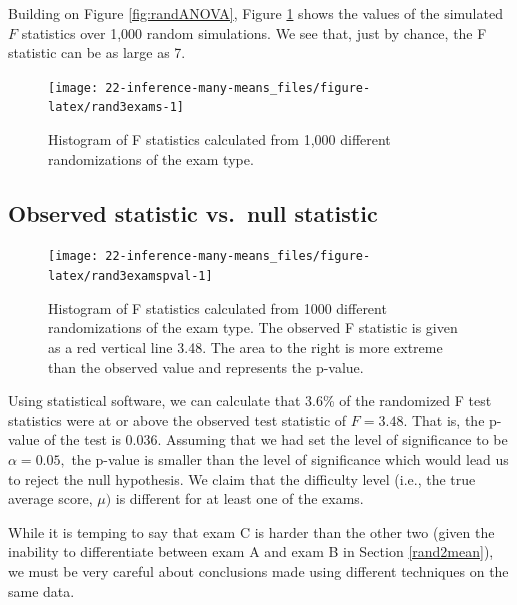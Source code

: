 \documentclass[
  10pt,
  openany]{book}
\begin{document}
Building on Figure \ref{fig:randANOVA}, Figure \ref{fig:rand3exams} shows the values of the simulated \(F\) statistics over 1,000 random simulations.
We see that, just by chance, the F statistic can be as large as 7.

\begin{figure}[h]

{\centering \texttt{[image: 22-inference-many-means\_files/figure-latex/rand3exams-1]} 

}

\caption{Histogram of F statistics calculated from 1,000 different randomizations of the exam type.}\label{fig:rand3exams}
\end{figure}

\hypertarget{observed-statistic-vs.-null-statistic}{%
\subsection{Observed statistic vs.~null statistic}\label{observed-statistic-vs.-null-statistic}}

\begin{figure}[h]

{\centering \texttt{[image: 22-inference-many-means\_files/figure-latex/rand3examspval-1]} 

}

\caption{Histogram of F statistics calculated from 1000 different randomizations of the exam type. The observed F statistic is given as a red vertical line 3.48.  The area to the right is more extreme than the observed value and represents the p-value.}\label{fig:rand3examspval}
\end{figure}

Using statistical software, we can calculate that 3.6\% of the randomized F test statistics were at or above the observed test statistic of \(F= 3.48.\) That is, the p-value of the test is 0.036.
Assuming that we had set the level of significance to be \(\alpha = 0.05,\) the p-value is smaller than the level of significance which would lead us to reject the null hypothesis.
We claim that the difficulty level (i.e., the true average score, \(\mu)\) is different for at least one of the exams.

While it is temping to say that exam C is harder than the other two (given the inability to differentiate between exam A and exam B in Section \ref{rand2mean}), we must be very careful about conclusions made using different techniques on the same data.
\end{document}
